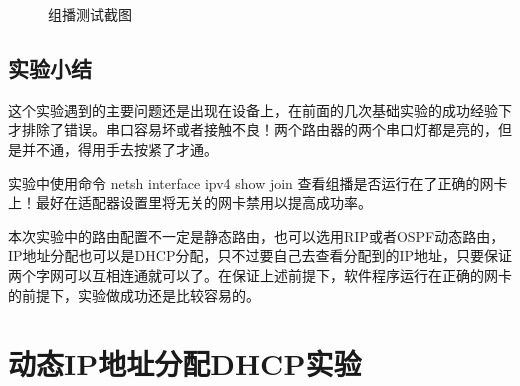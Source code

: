 \documentclass[lang=cn,11pt,a4paper,cite=authoryear]{elegantpaper}
\begin{document}
\begin{figure}[htbp]
	\centering
	\caption{组播测试截图}
	\label{fig:screenshot027}
\end{figure}



\subsection{实验小结}



这个实验遇到的主要问题还是出现在设备上，在前面的几次基础实验的成功经验下才排除了错误。串口容易坏或者接触不良！两个路由器的两个串口灯都是亮的，但是并不通，得用手去按紧了才通。

实验中使用命令 netsh interface ipv4 show join 查看组播是否运行在了正确的网卡上！最好在适配器设置里将无关的网卡禁用以提高成功率。

本次实验中的路由配置不一定是静态路由，也可以选用RIP或者OSPF动态路由，IP地址分配也可以是DHCP分配，只不过要自己去查看分配到的IP地址，只要保证两个字网可以互相连通就可以了。在保证上述前提下，软件程序运行在正确的网卡的前提下，实验做成功还是比较容易的。

\section{动态IP地址分配DHCP实验}
\end{document}
